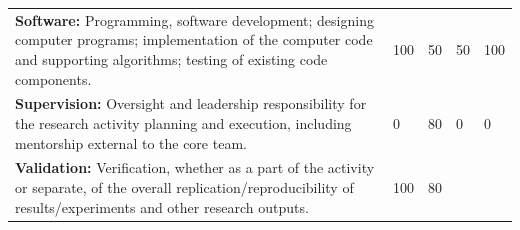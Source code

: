 \documentclass[a4paper,twoside=true,openright,parskip=full,chapterprefix=true,11pt,headings=normal,bibliography=totoc,listof=totoc,titlepage=on,captions=tableabove,draft=false]{scrreprt}
\theoremstyle{definition}
\theoremstyle{definition}
\theoremstyle{definition}
\theoremstyle{remark}
\begin{document}
\begin{longtable}[]{@{}lllll@{}}
\begin{minipage}[t]{0.49\columnwidth}\raggedright
\textbf{Software:} Programming, software development; designing computer
programs; implementation of the computer code and supporting algorithms;
testing of existing code components.\strut
\end{minipage} & \begin{minipage}[t]{0.11\columnwidth}\raggedright
100\strut
\end{minipage} & \begin{minipage}[t]{0.09\columnwidth}\raggedright
50\strut
\end{minipage} & \begin{minipage}[t]{0.10\columnwidth}\raggedright
50\strut
\end{minipage} & \begin{minipage}[t]{0.07\columnwidth}\raggedright
100\strut
\end{minipage}\tabularnewline
\begin{minipage}[t]{0.49\columnwidth}\raggedright
\textbf{Supervision:} Oversight and leadership responsibility for the
research activity planning and execution, including mentorship external
to the core team.\strut
\end{minipage} & \begin{minipage}[t]{0.11\columnwidth}\raggedright
0\strut
\end{minipage} & \begin{minipage}[t]{0.09\columnwidth}\raggedright
80\strut
\end{minipage} & \begin{minipage}[t]{0.10\columnwidth}\raggedright
0\strut
\end{minipage} & \begin{minipage}[t]{0.07\columnwidth}\raggedright
0\strut
\end{minipage}\tabularnewline
\begin{minipage}[t]{0.49\columnwidth}\raggedright
\textbf{Validation:} Verification, whether as a part of the activity or
separate, of the overall replication/reproducibility of
results/experiments and other research outputs.\strut
\end{minipage} & \begin{minipage}[t]{0.11\columnwidth}\raggedright
100\strut
\end{minipage} & \begin{minipage}[t]{0.09\columnwidth}\raggedright
80\strut
\end{minipage} & \begin{minipage}[t]{0.10\columnwidth}\raggedright

\end{minipage}
\end{longtable}
\end{document}
